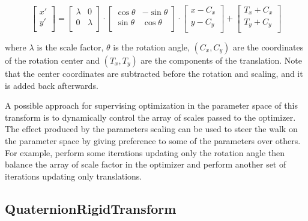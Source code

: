 \begin{equation}
\left[ 
\begin{array}{c}
x' \\
y' \\
\end{array}
\right]
=
\left[ 
\begin{array}{cc}
\lambda &    0     \\
   0    &  \lambda \\
\end{array}
\right]
\cdot
\left[ 
\begin{array}{cc}
\cos{\theta} & -\sin{\theta} \\
\sin{\theta} &  \cos{\theta} \\
\end{array}
\right]
\cdot
\left[ 
\begin{array}{c}
x - C_x \\
y - C_y \\
\end{array}
\right]
+ 
\left[ 
\begin{array}{c}
T_x + C_x \\
T_y + C_y \\
\end{array}
\right]
\end{equation}

where $\lambda$ is the scale factor, $\theta$ is the rotation angle,
$(C_x,C_y)$ are the coordinates of the rotation center and $(T_x,T_y)$ are
the components of the translation. Note that the center coordinates are
subtracted before the rotation and scaling, and it is added back afterwards.


A possible approach for supervising optimization in the parameter space of this
transform is to dynamically control the array of scales passed to the
optimizer. The effect produced by the parameters scaling  can be used to steer
the walk on the parameter space by giving preference to some of the parameters
over others. For example, perform some iterations updating only the rotation
angle then balance the array of scale factor in the optimizer and perform
another set of iterations updating only translations.


\subsection{QuaternionRigidTransform}
\label{sec:QuaternionRigidTransform}

